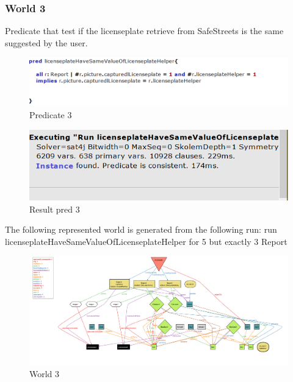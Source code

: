 \subsubsection{World 3}
Predicate that test if the licenseplate retrieve from SafeStreets is the same suggested by the user.
\begin{figure}[h]
	\centering
	\includegraphics[width=0.9\linewidth, height=0.15\textheight]{Images/Alloy/predworld31}
	\caption{Predicate 3}
	\label{Pred 3}
\end{figure}

\begin{figure}[h]
	\centering
	\includegraphics[width=0.8\linewidth, height=0.11\textheight]{Images/Alloy/predworld32}
	\caption{Result pred 3}
	\label{Result pred 3}
\end{figure}
\FloatBarrier
\newpage
The following represented world is generated from the following run: run licenseplateHaveSameValueOfLicenseplateHelper for 5 but exactly 3 Report
\begin{figure}[h]
	\centering
	\includegraphics[width=1.1\linewidth, height=0.55\textheight]{Images/Alloy/world3alloy}
	\caption{World 3}
	\label{World3}
\end{figure}
